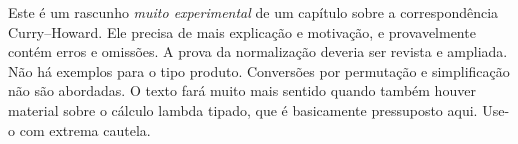 \documentclass[../../../include/open-logic-chapter]{subfiles}
\begin{document}

\begin{editorial}
  Este é um rascunho \emph{muito experimental} de um capítulo sobre a
  correspondência Curry--Howard. Ele precisa de mais explicação e
  motivação, e provavelmente contém erros e omissões. A prova
  da normalização deveria ser revista e ampliada. Não há
  exemplos para o tipo produto. Conversões por permutação e simplificação
  não são abordadas. O texto fará muito mais sentido quando também
  houver material sobre o cálculo lambda tipado, que é
  basicamente pressuposto aqui. Use-o com extrema cautela.
\end{editorial}


\OLEndChapterHook
\end{document}
